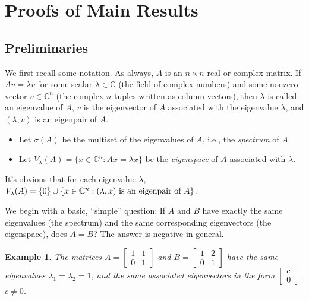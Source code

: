 \documentclass{article}
\newtheorem{exa}{Example}
\begin{document}
\section{Proofs of Main Results}

\subsection{Preliminaries}

We first recall some notation. As always, $A$ is an $n\times n$ real or complex matrix. If $Av=\lambda v$ for some scalar $\lambda \in \mathbb{C}$ (the field of complex numbers) and some nonzero vector
$v\in \mathbb{C}^n$ (the complex $n$-tuples written as  column vectors), then $\lambda$ is called an eigenvalue of $A$, $v$ is the eigenvector of $A$ associated with the eigenvalue $\lambda$, and $(\lambda,v)$ is an eigenpair of $A$.

\medskip
\begin{itemize}

\item Let $\sigma (A)$ be the multiset of the eigenvalues of $A$, i.e., the \emph{spectrum} of $A$.
\item Let $V_{\lambda}(A)=\{x\in \mathbb{C}^n : Ax=\lambda x\}$ be the \emph{eigenspace} of $A$ associated with $\lambda$.

\end{itemize}



It's obvious that for each eigenvalue  $\lambda$,
 $V_{\lambda}(A)=\{0\}\cup \{x \in \Bbb C^n : \mbox{$(\lambda, x)$ is an eigenpair of $A$}\}$.
 \medskip

We begin with a basic, ``simple'' question: If   $A$ and $B$  have exactly the same eigenvalues
(the spectrum) and the same corresponding eigenvectors (the eigenspace), does $A=B$?
The answer is negative in general.

\begin{exa}\label{exa:1}
\rm The matrices
 $A=\begin{bmatrix} 1 & 1  \\0 & 1\end{bmatrix}$  and
$B= \begin{bmatrix} 1 & 2\\ 0 & 1\end{bmatrix}$
  have the same eigenvalues $\lambda_1=\lambda_2=1$, and the same
 associated eigenvectors in the form  $ \begin{bmatrix} c \\ 0\end{bmatrix}$,
 $c\not =0$.
\end{exa}
\end{document}
